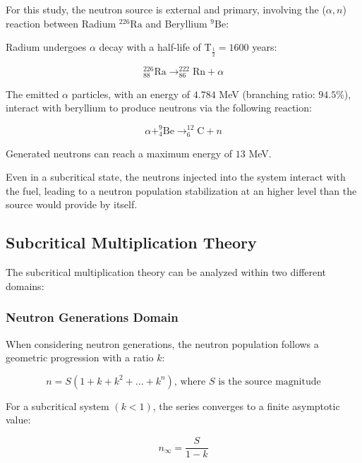 For this study, the neutron source is external and primary, involving the ($\alpha, n$) reaction between Radium $^{226}\text{Ra}$ and Beryllium $^9\text{Be}$:

Radium undergoes \(\alpha\) decay with a half-life of \(\text{T}_{\frac{1}{2}} = 1600\) years:

\begin{equation}
^{226}_{88}\text{Ra} \rightarrow ^{222}_{86}\text{Rn} + \alpha    
\end{equation}

The emitted \(\alpha\) particles, with an energy of \(4.784\) MeV (branching ratio: \(94.5\%\)), interact with beryllium to produce neutrons via the following reaction:

\begin{equation}
\alpha + ^9_4\text{Be} \rightarrow ^{12}_6\text{C} + n
\end{equation}

Generated neutrons can reach a maximum energy of \(13\) MeV.


Even in a subcritical state, the neutrons injected into the system interact with the fuel, leading to a neutron population stabilization at an higher level than the source would provide by itself.

\subsection{Subcritical Multiplication Theory}

The subcritical multiplication theory can be analyzed within two different domains:

\subsubsection{Neutron Generations Domain}

When considering neutron generations, the neutron population follows a geometric progression with a ratio $ k $:

\begin{equation}
n = S (1 + k + k^2 + ... + k^n) \text{, where } S \text{ is the source magnitude}
\end{equation}

For a subcritical system $( k < 1 )$, the series converges to a finite asymptotic value:

\begin{equation}
n_{\infty} = \frac{S}{1 - k}
\end{equation}

